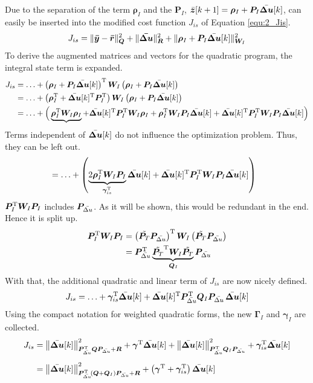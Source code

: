 Due to the separation of the term $\bm{\rho}_I$ and the $\bm{P}_I$, $\Bar{\bm z}[k+1] = \bm{\rho}_I + \bm{P}_I  \Bar{\bm{\Delta u}}[k]$, can easily be inserted into the modified cost function $J_{is}$ of Equation \eqref{equ:2_Jis}.
\[
J_{is} = \| \bm{\Bar{y}}  - \bm{\Bar{r}} \|_{\bm Q}^2  + \| \bm{{\Bar{\boldsymbol{\Delta u}}}} \|_{\bm{R}}^2 + \| \bm{\rho}_I + \bm{P}_I  \Bar{\bm{\Delta u}}[k] \|_{\bm{W}_I}^2
\]
To derive the augmented matrices and vectors for the quadratic program, the integral state term is expanded.
\begin{align*}
    J_{is}
    &= \ldots +
    \left(\bm{\rho}_I + \bm{P}_I\Bar{\bm{\Delta u}}[k]\right)^{\mathrm{T}}
    \bm{W}_I
    \left(\bm{\rho}_I + \bm{P}_I\Bar{\bm{\Delta u}}[k]\right) \\
    &= \ldots +
    \left(\bm{\rho}_I^{\mathrm{T}} + \Bar{\bm{\Delta u}}[k]^{\mathrm{T}}\bm{P}_I^{\mathrm{T}}\right)
    \bm{W}_I
    \left(\bm{\rho}_I + \bm{P}_I\Bar{\bm{\Delta u}}[k]\right) \\
    &= \ldots + \Big(
        \underbrace{\bm{\rho}_I^{\mathrm{T}} \bm{W}_I \bm{\rho}_I}
        + \Bar{\bm{\Delta u}}[k]^{\mathrm{T}}\bm{P}_I^{\mathrm{T}}\bm{W}_I\bm{\rho}_I
        + \bm{\rho}_I^{\mathrm{T}}\bm{W}_I\bm{P}_I\Bar{\bm{\Delta u}}[k]
        + \Bar{\bm{\Delta u}}[k]^{\mathrm{T}}\bm{P}_I^{\mathrm{T}}\bm{W}_I\bm{P}_I\Bar{\bm{\Delta u}}[k]
    \Big) \\
\end{align*}
Terms independent of $\Bar{\bm{\Delta u}}[k]$ do not influence the optimization problem. Thus, they can be left out. 
\begin{align*}
    &= \ldots + \left(
        \underbrace{2\bm{\rho}_I^{\mathrm{T}}\bm{W}_I\bm{P}_I}_{\bm{\gamma}_{is}^{\mathrm{T}}}\Bar{\bm{\Delta u}}[k]
        + \Bar{\bm{\Delta u}}[k]^{\mathrm{T}}
        {\bm{P}_I^{\mathrm{T}}\bm{W}_I\bm{P}_I}
        \Bar{\bm{\Delta u}}[k]
    \right)
\end{align*}
$\bm{P}_I^{\mathrm{T}}\bm{W}_I\bm{P}_I$ includes $\bm{P}_{\Bar{\Delta u}}$. As it will be shown, this would be redundant in the end. Hence it is split up.
\begin{align*}
     \bm{P}_I^{\mathrm{T}}\bm{W}_I\bm{P}_I
    &= \left({\tilde{\bm{P}_T}}\bm{P}_{\Bar{\Delta u}}\right)^{\mathrm{T}}
    \bm{W}_I
    \left({\tilde{\bm{P}_T}}\bm{P}_{\Bar{\Delta u}}\right) \\
    &= \bm{P}_{\Bar{\Delta u}}^{\mathrm{T}}
    \underbrace{
        {\tilde{\bm{P}_T}}^{\mathrm{T}}\bm{W}_I{\tilde{\bm{P}_T}}
    }_{\,\bm{Q}_I}
    \bm{P}_{\Bar{\Delta u}}
\end{align*}
With that, the additional quadratic and linear term of $J_{is}$ are now nicely defined.
\[
   J_{is} = \ldots
    + \bm{\gamma}_{is}^{\mathrm{T}}\Bar{\bm{\Delta u}}[k]
    + \Bar{\bm{\Delta u}}[k]^{\mathrm{T}}\bm{P}_{\Bar{\Delta u}}^{\mathrm{T}}\bm{Q}_I\bm{P}_{\Bar{\Delta u}}\,\Bar{\bm{\Delta u}}[k]
\]
Using the compact notation for weighted quadratic forms, the new $\bm{\Gamma}_I$ and $\bm{\gamma}_I$ are collected.
\begin{align*}
    J_{is}
    &=
    \left\|\Bar{\bm{\Delta u}}[k]\right\|^2_{\bm{P}_{\Bar{\Delta u}}^{\mathrm{T}}\bm{Q}\bm{P}_{\Bar{\Delta u}} + \bm{R}}
    + \bm{\gamma}^{\mathrm{T}}\Bar{\bm{\Delta u}}[k]
    + \left\|\Bar{\bm{\Delta u}}[k]\right\|^2_{\bm{P}_{\Bar{\Delta u}}^{\mathrm{T}}\bm{Q}_I\bm{P}_{\Bar{\Delta u}}}
    + \bm{\gamma}_{is}^{\mathrm{T}}\Bar{\bm{\Delta u}}[k] \\[6pt]
    &=
    \left\|\Bar{\bm{\Delta u}}[k]\right\|^2_{\bm{P}_{\Bar{\Delta u}}^{\mathrm{T}}\!\left(\bm{Q}+\bm{Q}_I\right)\bm{P}_{\Bar{\Delta u}} + \bm{R}}
    +
    \left(\bm{\gamma}^{\mathrm{T}} + \bm{\gamma}_{is}^{\mathrm{T}}\right)\Bar{\bm{\Delta u}}[k]
\end{align*}
